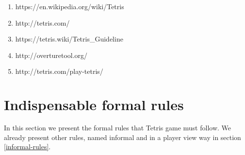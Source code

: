 \documentclass[a4paper]{article}
\begin{document}
\begin{enumerate}
	
\item https://en.wikipedia.org/wiki/Tetris
\item http://tetris.com/
\item https://tetris.wiki/Tetris\_Guideline
\item http://overturetool.org/
\item http://tetris.com/play-tetris/

\end{enumerate}

\newpage
\appendix

\section{Indispensable formal rules}\label{rules}
In this section we present the formal rules that Tetris game must follow. We already present other rules, named informal and in a player view way in section \ref{informal-rules}.
\end{document}
